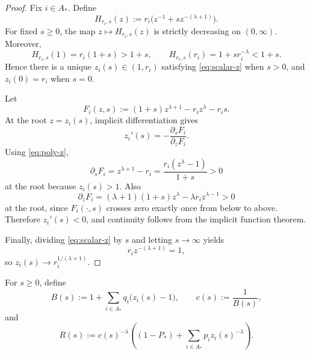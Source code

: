 \documentclass[11pt]{article}
\theoremstyle{definition}
\theoremstyle{remark}
\newcommand{\1}{\mathbf{1}}
\begin{document}
\begin{proof}
Fix $i\in A_*$. Define
\[
H_{r_i,s}(z):=r_i\bigl(z^{-1}+s z^{-(\lambda+1)}\bigr).
\]
For fixed $s\ge 0$, the map $z\mapsto H_{r_i,s}(z)$ is strictly decreasing on $(0,\infty)$. Moreover,
\[
H_{r_i,s}(1)=r_i(1+s)>1+s,
\qquad
H_{r_i,s}(r_i)=1+s r_i^{-\lambda}<1+s.
\]
Hence there is a unique $z_i(s)\in(1,r_i)$ satisfying \eqref{eq:scalar-z} when $s>0$, and $z_i(0)=r_i$ when $s=0$.

Let
\[
F_i(z,s):=(1+s)z^{\lambda+1}-r_i z^\lambda-r_i s.
\]
At the root $z=z_i(s)$, implicit differentiation gives
\[
z_i'(s)=-\frac{\partial_sF_i}{\partial_zF_i}.
\]
Using \eqref{eq:poly-z},
\[
\partial_sF_i=z^{\lambda+1}-r_i
=\frac{r_i(z^\lambda-1)}{1+s}>0
\]
at the root because $z_i(s)>1$. Also
\[
\partial_zF_i=(\lambda+1)(1+s)z^\lambda-\lambda r_i z^{\lambda-1}>0
\]
at the root, since $F_i(\cdot,s)$ crosses zero exactly once from below to above. Therefore $z_i'(s)<0$, and continuity follows from the implicit function theorem.

Finally, dividing \eqref{eq:scalar-z} by $s$ and letting $s\to\infty$ yields
\[
r_i z^{-(\lambda+1)}=1,
\]
so $z_i(s)\to r_i^{1/(\lambda+1)}$.
\end{proof}

For $s\ge 0$, define
\begin{equation}
\label{eq:def-B}
B(s):=1+\sum_{i\in A_*} q_i\bigl(z_i(s)-1\bigr),
\qquad
c(s):=\frac{1}{B(s)},
\end{equation}
and
\begin{equation}
\label{eq:def-R}
R(s):=c(s)^{-\lambda}\left((1-P_*)+\sum_{i\in A_*} p_i z_i(s)^{-\lambda}\right).
\end{equation}
\end{document}
